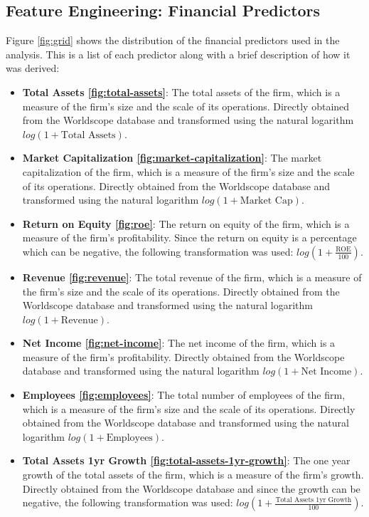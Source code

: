 \subsection{Feature Engineering: Financial Predictors}
Figure \ref{fig:grid} shows the distribution of the financial predictors used in the analysis. This is a list of each predictor along with a brief description of how it was derived:
\begin{itemize}
    \item \textbf{Total Assets \ref{fig:total-assets}}: The total assets of the firm, which is a measure of the firm's size and the scale of its operations. Directly obtained from the Worldscope database and transformed using the natural logarithm $log(1 + \text{Total Assets})$.
    \item \textbf{Market Capitalization \ref{fig:market-capitalization}}: The market capitalization of the firm, which is a measure of the firm's size and the scale of its operations. Directly obtained from the Worldscope database and transformed using the natural logarithm $log(1 + \text{Market Cap})$.
    \item \textbf{Return on Equity \ref{fig:roe}}: The return on equity of the firm, which is a measure of the firm's profitability. Since the return on equity is a percentage which can be negative, the following transformation was used: $log(1 + \frac{\text{ROE}}{100})$.
    \item \textbf{Revenue \ref{fig:revenue}}: The total revenue of the firm, which is a measure of the firm's size and the scale of its operations. Directly obtained from the Worldscope database and transformed using the natural logarithm $log(1 + \text{Revenue})$.
    \item \textbf{Net Income \ref{fig:net-income}}: The net income of the firm, which is a measure of the firm's profitability. Directly obtained from the Worldscope database and transformed using the natural logarithm $log(1 + \text{Net Income})$.
    \item \textbf{Employees \ref{fig:employees}}: The total number of employees of the firm, which is a measure of the firm's size and the scale of its operations. Directly obtained from the Worldscope database and transformed using the natural logarithm $log(1 + \text{Employees})$.
    \item \textbf{Total Assets 1yr Growth \ref{fig:total-assets-1yr-growth}}: The one year growth of the total assets of the firm, which is a measure of the firm's growth. Directly obtained from the Worldscope database and since the growth can be negative, the following transformation was used: $log(1 + \frac{\text{Total Assets 1yr Growth}}{100})$.

\end{itemize}

